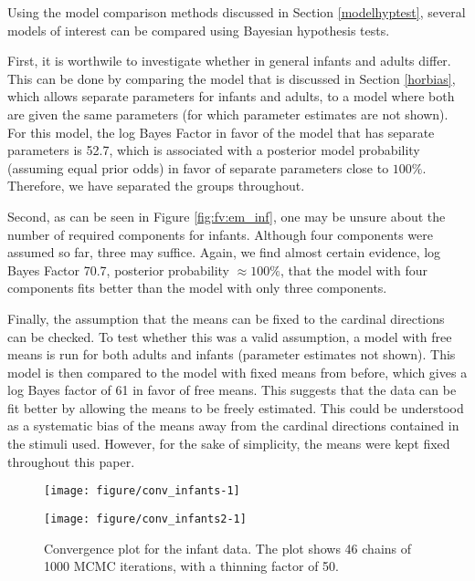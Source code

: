 Using the model comparison methods discussed in Section \ref{modelhyptest}, several models of interest can be compared using Bayesian hypothesis tests.

First, it is worthwile to investigate whether in general infants and adults differ. This can be done by comparing the model that is discussed in Section \ref{horbias}, which allows separate parameters for infants and adults, to a model where both are given the same parameters (for which parameter estimates are not shown). For this model, the log Bayes Factor in favor of the model that has separate parameters is 52.7, which is associated with a posterior model probability (assuming equal prior odds) in favor of separate parameters close to \(100\%\). Therefore, we have separated the groups throughout.

Second, as can be seen in Figure \ref{fig:fv:em_inf}, one may be unsure about the number of required components for infants. Although four components were assumed so far, three may suffice. Again, we find almost certain evidence, log Bayes Factor 70.7,  posterior probability \(\approx 100\%\), that the model with four components fits better than the model with only three components.

Finally, the assumption that the means can be fixed to the cardinal directions can be checked. To test whether this was a valid assumption, a model with free means is run for both adults and infants (parameter estimates not shown). This model is then compared to the model with fixed means from before, which gives a log Bayes factor of 61 in favor of free means. This suggests that the data can be fit better by allowing the means to be freely estimated. This could be understood as a systematic bias of the means away from the cardinal directions contained in the stimuli used. However, for the sake of simplicity, the means were kept fixed throughout this paper.



\begin{figure}
\begin{center}
\begin{knitrout}
\color{fgcolor}
\texttt{[image: figure/conv\_infants-1]} 

\end{knitrout}
\hspace{-.7cm}
\begin{knitrout}
\color{fgcolor}
\texttt{[image: figure/conv\_infants2-1]} 

\end{knitrout}

\end{center}
\caption{Convergence plot for the infant data. The plot shows 46 chains of 1000 MCMC iterations, with a thinning factor of 50. }
\label{fig:convergence_infants}
\end{figure}

